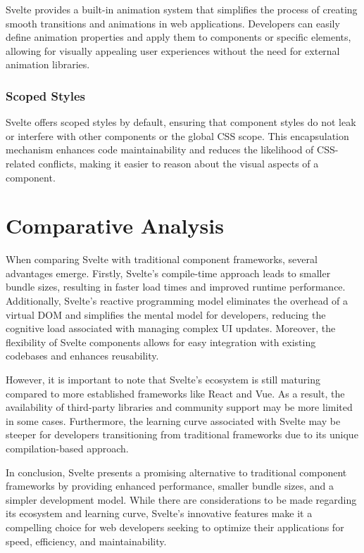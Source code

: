 Svelte provides a built-in animation system that simplifies the process of creating smooth transitions and animations in web applications. Developers can easily define animation properties and apply them to components or specific elements, allowing for visually appealing user experiences without the need for external animation libraries.

\subsubsection{Scoped Styles}

Svelte offers scoped styles by default, ensuring that component styles do not leak or interfere with other components or the global CSS scope. This encapsulation mechanism enhances code maintainability and reduces the likelihood of CSS-related conflicts, making it easier to reason about the visual aspects of a component.

\section{Comparative Analysis}

When comparing Svelte with traditional component frameworks, several advantages emerge. Firstly, Svelte's compile-time approach leads to smaller bundle sizes, resulting in faster load times and improved runtime performance. Additionally, Svelte's reactive programming model eliminates the overhead of a virtual DOM and simplifies the mental model for developers, reducing the cognitive load associated with managing complex UI updates. Moreover, the flexibility of Svelte components allows for easy integration with existing codebases and enhances reusability.

However, it is important to note that Svelte's ecosystem is still maturing compared to more established frameworks like React and Vue. As a result, the availability of third-party libraries and community support may be more limited in some cases. Furthermore, the learning curve associated with Svelte may be steeper for developers transitioning from traditional frameworks due to its unique compilation-based approach.

In conclusion, Svelte presents a promising alternative to traditional component frameworks by providing enhanced performance, smaller bundle sizes, and a simpler development model. While there are considerations to be made regarding its ecosystem and learning curve, Svelte's innovative features make it a compelling choice for web developers seeking to optimize their applications for speed, efficiency, and maintainability.

